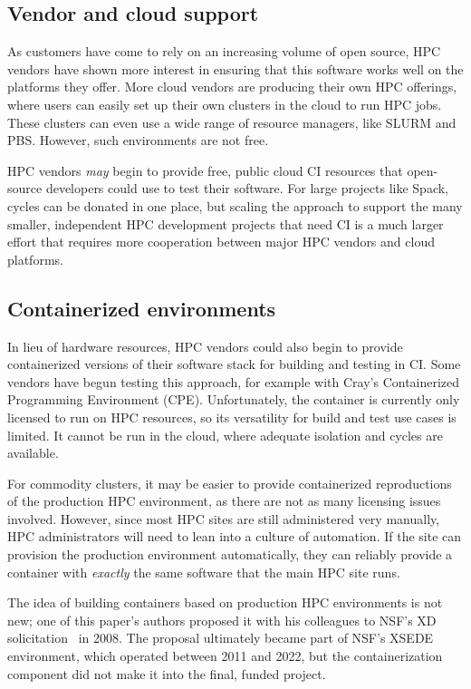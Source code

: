 \documentclass{IEEEcsmag}
\begin{document}
\subsection{Vendor and cloud support}

As customers have come to rely on an increasing volume of open source, HPC vendors have
shown more interest in ensuring that this software works well on the platforms
they offer.  More cloud vendors are producing their own HPC
offerings, where users can easily set up their own clusters in the cloud to run
HPC jobs. These clusters can even use a wide range of resource managers, like SLURM and PBS.
However, such environments are not free.

HPC vendors {\it may} begin to provide free, public cloud CI resources that open-source
developers could use to test their software. For large projects like
Spack, cycles can be donated in one place, but scaling the approach to support the many smaller,
independent HPC development projects that need CI is a much larger effort that
requires more cooperation between major HPC vendors and cloud platforms.

\subsection{Containerized environments}

In lieu of hardware resources, HPC vendors could also begin to provide containerized
versions of their software stack for building and testing in CI. Some vendors
have begun testing this approach, for example with Cray's Containerized Programming Environment
(CPE). Unfortunately, the container is currently only licensed to run on HPC resources,
so its versatility for build and test use cases is limited. It cannot be run in the
cloud, where adequate isolation and cycles are available.

For commodity clusters, it may be easier to provide containerized reproductions of the
production HPC environment, as there are not as many licensing issues involved. However,
since most HPC sites are still administered very manually, HPC administrators will need
to lean into a culture of automation. If the site can provision the production environment
automatically, they can reliably provide a container with {\it exactly} the
same software that the main HPC site runs.

The idea of building containers based on production HPC environments is not new; one
of this paper's authors proposed it with his colleagues to NSF's XD
solicitation~\cite{NSF-XD} in 2008.  The proposal ultimately became part of NSF's
XSEDE environment, which operated between 2011 and 2022, but the containerization
component did not make it into the final, funded project.
\end{document}
